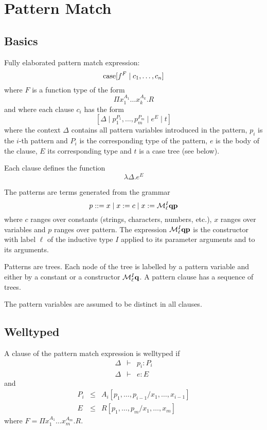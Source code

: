 \section{Pattern Match}

\subsection{Basics}

Fully elaborated pattern match expression:
$$
{\text{case}}[ f^F \mid c_1,  \ldots, c_n]
$$
%
where $F$ is a function type of the form
%
$$
\Pi x_1^{A_1} \ldots x_k^{A_k}. R
$$
%
and where each clause $c_i$ has the form
%
$$
    [\Delta \mid p_1^{P_1}, \ldots, p_m^{P_m} \mid e^E \mid t]
$$
where the context $\Delta$ contains all pattern variables introduced in the
pattern, $p_i$ is the $i$-th pattern
and $P_i$ is the corresponding type of the pattern, $e$ is the body of the
clause, $E$ its corresponding type and $t$ is a case tree (see below).

Each clause defines the function
$$
\lambda \Delta . e^E
$$


The patterns are terms generated from the grammar
$$
    p ::= x \mid x := c \mid x := {\cal M}^I_\ell {\mathbf q} {\mathbf p}
$$
where $c$ ranges over constants (strings, characters, numbers, etc.), $x$ ranges
over variables and $p$ ranges over pattern. The expression ${\cal M}^I_\ell {\mathbf q}
{\mathbf p}$ is the constructor with label $\ell$ of the inductive type $I$ applied to its
parameter arguments and to its arguments.

Patterns are trees. Each node of the tree is labelled by a pattern variable and
either by a constant or a constructor ${\cal M}^I_\ell {\mathbf q}$. A pattern clause has a
sequence of trees.

The pattern variables are assumed to be distinct in all clauses.



\subsection{Welltyped}

A clause of the pattern match expression is welltyped if
$$
\begin{array}{lll}
    \Delta &\vdash& p_i : P_i
    \\
    \Delta &\vdash& e : E
\end{array}
$$
%
and
%
$$
\begin{array}{lll}
    P_i &\le& A_i[p_1,\ldots,p_{i-1} / x_1,\ldots,x_{i-1}]
    \\
    E   &\le& R[p_1,\ldots,p_m / x_1,\ldots,x_m]
\end{array}
$$
%
where $F = \Pi x_1^{A_1} \ldots x_m^{A_m}. R$.




